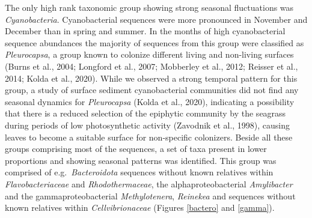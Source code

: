 \documentclass[
  12pt,
]{article}
\begin{document}
The only high rank taxonomic group showing strong seasonal fluctuations
was \emph{Cyanobacteria}. Cyanobacterial sequences were more pronounced
in November and December than in spring and summer. In the months of
high cyanobacterial sequence abundances the majority of sequences from
this group were classified as \emph{Pleurocapsa}, a group known to
colonize different living and non-living surfaces (Burns et al., 2004;
Longford et al., 2007; Mobberley et al., 2012; Reisser et al., 2014;
Kolda et al., 2020). While we observed a strong temporal pattern for
this group, a study of surface sediment cyanobacterial communities did
not find any seasonal dynamics for \emph{Pleurocapsa} (Kolda et al.,
2020), indicating a possibility that there is a reduced selection of the
epiphytic community by the seagrass during periods of low photosynthetic
activity (Zavodnik et al., 1998), causing leaves to become a suitable
surface for non-specific colonizers. Beside all these groups comprising
most of the sequences, a set of taxa present in lower proportions and
showing seasonal patterns was identified. This group was comprised of
e.g.~\emph{Bacteroidota} sequences without known relatives within
\emph{Flavobacteriaceae} and \emph{Rhodothermaceae}, the
alphaproteobacterial \emph{Amylibacter} and the gammaproteobacterial
\emph{Methylotenera}, \emph{Reinekea} and sequences without known
relatives within \emph{Cellvibrionaceae} (Figures \ref{bactero} and
\ref{gamma}).
\end{document}
